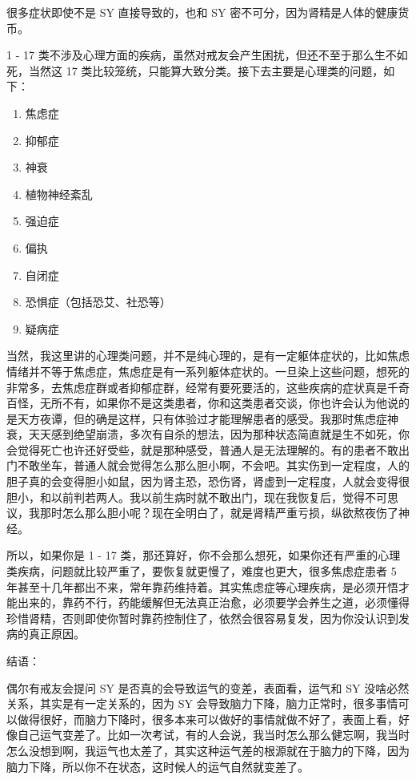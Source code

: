 \documentclass[fontset=founder]{ctexart}
\begin{document}
很多症状即使不是 SY 直接导致的，也和 SY 密不可分，因为肾精是人体的健康货币。

1 - 17 类不涉及心理方面的疾病，虽然对戒友会产生困扰，但还不至于那么生不如死，当然这 17 类比较笼统，只能算大致分类。接下去主要是心理类的问题，如下：

\begin{enumerate}
    \item 焦虑症
    \item 抑郁症
    \item 神衰
    \item 植物神经紊乱
    \item 强迫症
    \item 偏执
    \item 自闭症
    \item 恐惧症（包括恐艾、社恐等）
    \item 疑病症
\end{enumerate}

当然，我这里讲的心理类问题，并不是纯心理的，是有一定躯体症状的，比如焦虑情绪并不等于焦虑症，焦虑症是有一系列躯体症状的。一旦染上这些问题，想死的非常多，去焦虑症群或者抑郁症群，经常有要死要活的，这些疾病的症状真是千奇百怪，无所不有，如果你不是这类患者，你和这类患者交谈，你也许会认为他说的是天方夜谭，但的确是这样，只有体验过才能理解患者的感受。我那时焦虑症神衰，天天感到绝望崩溃，多次有自杀的想法，因为那种状态简直就是生不如死，你会觉得死亡也许还好受些，就是那种感受，普通人是无法理解的。有的患者不敢出门不敢坐车，普通人就会觉得怎么那么胆小啊，不会吧。其实伤到一定程度，人的胆子真的会变得胆小如鼠，因为肾主恐，恐伤肾，肾虚到一定程度，人就会变得很胆小，和以前判若两人。我以前生病时就不敢出门，现在我恢复后，觉得不可思议，我那时怎么那么胆小呢？现在全明白了，就是肾精严重亏损，纵欲熬夜伤了神经。

所以，如果你是 1 - 17 类，那还算好，你不会那么想死，如果你还有严重的心理类疾病，问题就比较严重了，要恢复就更慢了，难度也更大，很多焦虑症患者 5 年甚至十几年都出不来，常年靠药维持着。其实焦虑症等心理疾病，是必须开悟才能出来的，靠药不行，药能缓解但无法真正治愈，必须要学会养生之道，必须懂得珍惜肾精，否则即使你暂时靠药控制住了，依然会很容易复发，因为你没认识到发病的真正原因。

结语：

偶尔有戒友会提问 SY 是否真的会导致运气的变差，表面看，运气和 SY 没啥必然关系，其实是有一定关系的，因为 SY 会导致脑力下降，脑力正常时，很多事情可以做得很好，而脑力下降时，很多本来可以做好的事情就做不好了，表面上看，好像自己运气变差了。比如一次考试，有的人会说，我当时怎么那么健忘啊，我当时怎么没想到啊，我运气也太差了，其实这种运气差的根源就在于脑力的下降，因为脑力下降，所以你不在状态，这时候人的运气自然就变差了。
\end{document}
